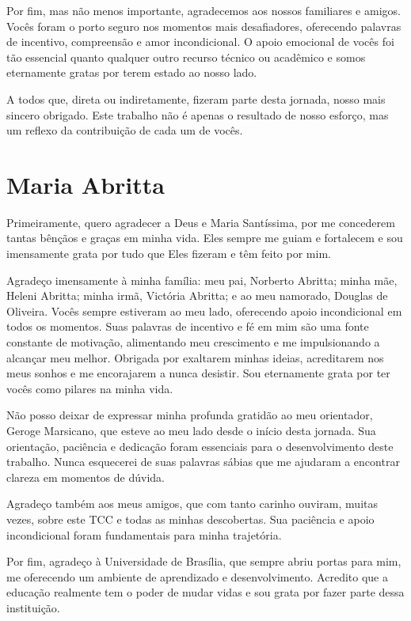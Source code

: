 \begin{agradecimentos}
Por fim, mas não menos importante, agradecemos aos nossos familiares e amigos. Vocês foram o porto seguro nos momentos mais desafiadores, oferecendo palavras de incentivo, compreensão e amor incondicional. O apoio emocional de vocês foi tão essencial quanto qualquer outro recurso técnico ou acadêmico e somos eternamente gratas por terem estado ao nosso lado.

A todos que, direta ou indiretamente, fizeram parte desta jornada, nosso mais sincero obrigado. Este trabalho não é apenas o resultado de nosso esforço, mas um reflexo da contribuição de cada um de vocês.

\section{Maria Abritta}

Primeiramente, quero agradecer a Deus e Maria Santíssima, por me concederem tantas bênçãos e graças em minha vida. Eles sempre me guiam e fortalecem e sou imensamente grata por tudo que Eles fizeram e têm feito por mim.

Agradeço imensamente à minha família: meu pai, Norberto Abritta; minha mãe, Heleni Abritta; minha irmã, Victória Abritta; e ao meu namorado, Douglas de Oliveira. Vocês sempre estiveram ao meu lado, oferecendo apoio incondicional em todos os momentos. Suas palavras de incentivo e fé em mim são uma fonte constante de motivação, alimentando meu crescimento e me impulsionando a alcançar meu melhor. Obrigada por exaltarem minhas ideias, acreditarem nos meus sonhos e me encorajarem a nunca desistir. Sou eternamente grata por ter vocês como pilares na minha vida.

Não posso deixar de expressar minha profunda gratidão ao meu orientador, Geroge Marsicano, que esteve ao meu lado desde o início desta jornada. Sua orientação, paciência e dedicação foram essenciais para o desenvolvimento deste trabalho. Nunca esquecerei de suas palavras sábias que me ajudaram a encontrar clareza em momentos de dúvida.

Agradeço também aos meus amigos, que com tanto carinho ouviram, muitas vezes, sobre este TCC e todas as minhas descobertas. Sua paciência e apoio incondicional foram fundamentais para minha trajetória.

Por fim, agradeço à Universidade de Brasília, que sempre abriu portas para mim, me oferecendo um ambiente de aprendizado e desenvolvimento. Acredito que a educação realmente tem o poder de mudar vidas e sou grata por fazer parte dessa instituição.

\end{agradecimentos}
